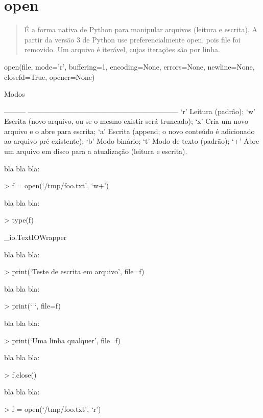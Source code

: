 \documentclass[letterpaper,10pt,brazil]{sphinxmanual}
\begin{document}
\begin{sphinxVerbatim}[commandchars=\\\{\}]
\end{sphinxVerbatim}


\chapter{open}
\label{\detokenize{content/open:open}}\label{\detokenize{content/open::doc}}\begin{quote}

É a forma nativa de Python para manipular arquivos (leitura e escrita).
A partir da versão 3 de Python use preferencialmente open, pois file foi removido.
Um arquivo é iterável, cujas iterações são por linha.
\end{quote}

open(file, mode=’r’, buffering=\sphinxhyphen{}1, encoding=None, errors=None, newline=None, closefd=True, opener=None)

Modos

——— —————————————————————
‘r’       Leitura (padrão);
‘w’       Escrita (novo arquivo, ou se o mesmo existir será truncado);
‘x’       Cria um novo arquivo e o abre para escrita;
‘a’       Escrita (append; o novo conteúdo é adicionado ao arquivo pré existente);
‘b’       Modo binário;
‘t’       Modo de texto (padrão);
‘+’       Abre um arquivo em disco para a atualização (leitura e escrita).

bla bla bla:

\textgreater{} f = open(‘/tmp/foo.txt’, ‘w+’)

bla bla bla:

\textgreater{} type(f)

\_io.TextIOWrapper

bla bla bla:

\textgreater{} print(‘Teste de escrita em arquivo’, file=f)

bla bla bla:

\textgreater{} print(‘ ‘, file=f)

bla bla bla:

\textgreater{} print(‘Uma linha qualquer’, file=f)

bla bla bla:

\textgreater{} f.close()

bla bla bla:

\textgreater{} f = open(‘/tmp/foo.txt’, ‘r’)
\end{document}
